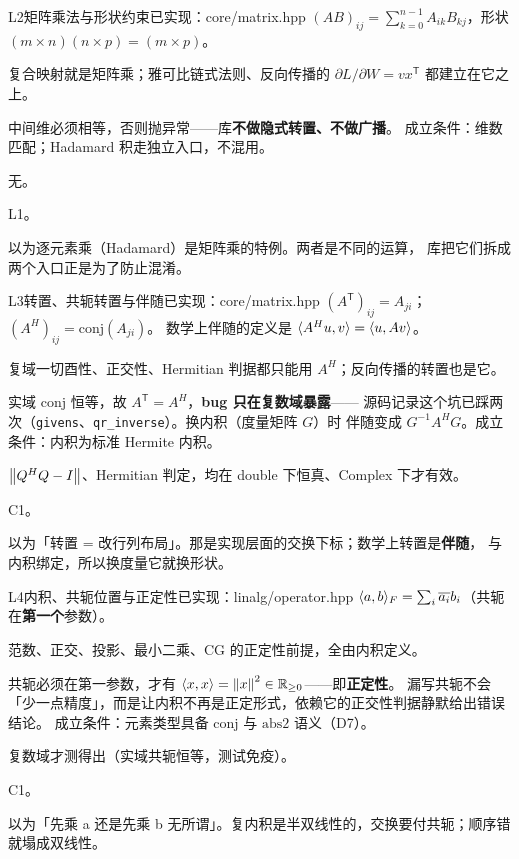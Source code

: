 \begin{know}{L2}{矩阵乘法与形状约束}{已实现：core/matrix.hpp}
 $(AB)_{ij}=\sum_{k=0}^{n-1}A_{ik}B_{kj}$，形状 $(m\times n)(n\times p)=(m\times p)$。

 复合映射就是矩阵乘；雅可比链式法则、反向传播的 $\partial L/\partial W=vx^{\mathsf T}$
都建立在它之上。

 中间维必须相等，否则抛异常——库\textbf{不做隐式转置、不做广播}。
成立条件：维数匹配；Hadamard 积走独立入口，不混用。

 无。

 L1。

 以为逐元素乘（Hadamard）是矩阵乘的特例。两者是不同的运算，
库把它们拆成两个入口正是为了防止混淆。
\end{know}

\begin{know}{L3}{转置、共轭转置与伴随}{已实现：core/matrix.hpp}
 $(A^{\mathsf T})_{ij}=A_{ji}$；$(A^{H})_{ij}=\mathrm{conj}(A_{ji})$。
数学上伴随的定义是 $\langle A^{H}u,v\rangle=\langle u,Av\rangle$。

 复域一切酉性、正交性、Hermitian 判据都只能用 $A^{H}$；反向传播的转置也是它。

 实域 $\mathrm{conj}$ 恒等，故 $A^{\mathsf T}=A^{H}$，\textbf{bug 只在复数域暴露}——
源码记录这个坑已踩两次（\texttt{givens}、\texttt{qr\_inverse}）。换内积（度量矩阵 $G$）时
伴随变成 $G^{-1}A^{H}G$。成立条件：内积为标准 Hermite 内积。

 $\left\lVert Q^{H}Q-I\right\rVert$、Hermitian 判定，均在 double 下恒真、Complex 下才有效。

 C1。

 以为「转置 = 改行列布局」。那是实现层面的交换下标；数学上转置是\textbf{伴随}，
与内积绑定，所以换度量它就换形状。
\end{know}

\begin{know}{L4}{内积、共轭位置与正定性}{已实现：linalg/operator.hpp}
 $\langle a,b\rangle_{F}=\sum_i \overline{a_i}b_i$（共轭在\textbf{第一个}参数）。

 范数、正交、投影、最小二乘、CG 的正定性前提，全由内积定义。

 共轭必须在第一参数，才有 $\langle x,x\rangle=\left\lVert x\right\rVert^{2}\in\mathbb{R}_{\ge0}$——即\textbf{正定性}。
漏写共轭不会「少一点精度」，而是让内积不再是正定形式，依赖它的正交性判据静默给出错误结论。
成立条件：元素类型具备 $\mathrm{conj}$ 与 $\mathrm{abs2}$ 语义（D7）。

 复数域才测得出（实域共轭恒等，测试免疫）。

 C1。

 以为「先乘 a 还是先乘 b 无所谓」。复内积是半双线性的，交换要付共轭；顺序错就塌成双线性。
\end{know}

